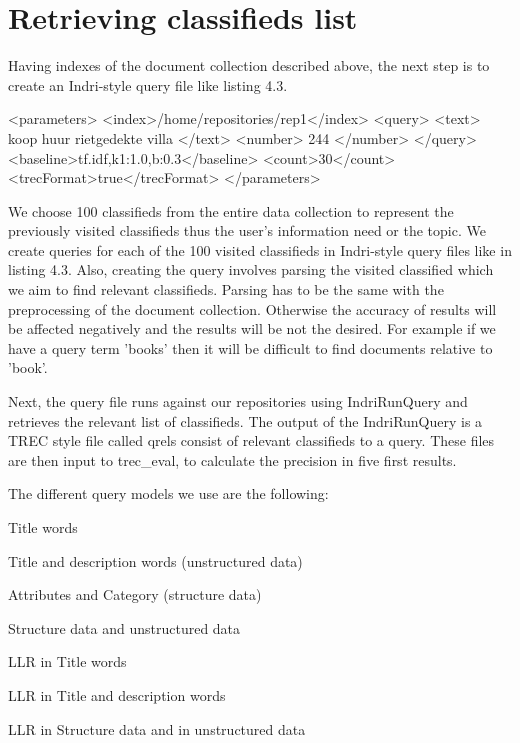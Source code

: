 \section{Retrieving classifieds list}

Having indexes of the document collection described above, the next step is to create an Indri-style query file like listing 4.3.

\begin{code}[caption={Query parameter file}]
<parameters>
 <index>/home/repositories/rep1</index>
  <query>
 	<text> koop huur rietgedekte villa </text>
	<number> 244 </number>
  </query>
  <baseline>tf.idf,k1:1.0,b:0.3</baseline>
  <count>30</count>
  <trecFormat>true</trecFormat>
</parameters>
\end{code}

We choose 100 classifieds from the entire data collection to represent the previously visited classifieds thus the user's information need or the topic. We create queries for each of the 100 visited classifieds in Indri-style query files like in listing 4.3. Also, creating the query involves parsing the visited classified which we aim to find relevant classifieds. Parsing has to be the same with the preprocessing of the document collection. Otherwise the accuracy of results will be affected negatively and the results will be not the desired. For example if we have a query term 'books' then it will be difficult to find documents relative to 'book'.

Next, the query file runs against our repositories using IndriRunQuery and retrieves the relevant list of classifieds. The output of the IndriRunQuery is a TREC style file called qrels consist of relevant classifieds to a query. These files are then input to trec\_eval, to calculate the precision in five first results.


The different query models we use are the following:

\begin{list}{.}{}
\item{Title words}
\item{Title and description words (unstructured data)}
\item{Attributes and Category (structure data)}
\item{Structure data and unstructured data}
\item{LLR in Title words}
\item{LLR in Title and description words}
\item{LLR in Structure data and in unstructured data}
\end{list}


